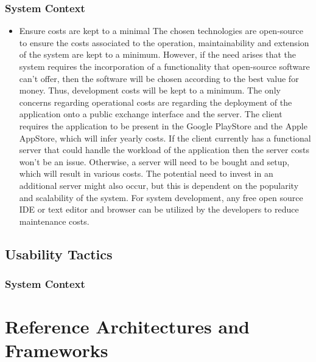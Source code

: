 \documentclass[11pt,fleqn]{book} %
\begin{document}
	\subsection{System Context}
	\begin{itemize}
		\item Ensure costs are kept to a minimal \newline\newline
		The chosen technologies are open-source to ensure the costs associated to the operation, maintainability and extension of the system are kept to a minimum. However, if the need arises that the system requires the incorporation of a functionality that open-source software can’t offer, then the software will be chosen according to the best value for money. Thus, development costs will be kept to a minimum. The only concerns regarding operational costs are regarding the deployment of the application onto a public exchange interface and the server. The client requires the application to be present in the Google PlayStore and the Apple AppStore, which will infer yearly costs. If the client currently has a functional server that could handle the workload of the application then the server costs won’t be an issue. Otherwise, a server will need to be bought and setup, which will result in various costs. The potential need to invest in an additional server might also occur, but this is dependent on the popularity and scalability of the system. For system development, any free open source IDE or text editor and browser can be utilized by the developers to reduce maintenance costs.
		
	\end{itemize}
	\section{Usability Tactics}
	\subsection{System Context}
	
	
	
	\chapter{Reference Architectures and Frameworks}
	
\end{document}
